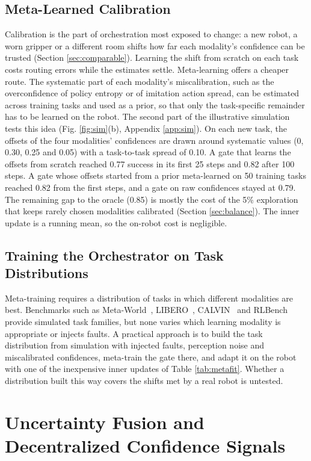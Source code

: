\documentclass[journal]{IEEEtran}
\begin{document}
\subsection{Meta-Learned Calibration}\label{sec:metacal}
Calibration is the part of orchestration most exposed to change: a new robot, a worn gripper or a different room shifts how far each modality's confidence can be trusted (Section \ref{sec:comparable}). Learning the shift from scratch on each task costs routing errors while the estimates settle. Meta-learning offers a cheaper route. The systematic part of each modality's miscalibration, such as the overconfidence of policy entropy or of imitation action spread, can be estimated across training tasks and used as a prior, so that only the task-specific remainder has to be learned on the robot. The second part of the illustrative simulation tests this idea (Fig. \ref{fig:sim}(b), Appendix \ref{app:sim}). On each new task, the offsets of the four modalities' confidences are drawn around systematic values (0, 0.30, 0.25 and 0.05) with a task-to-task spread of 0.10. A gate that learns the offsets from scratch reached 0.77 success in its first 25 steps and 0.82 after 100 steps. A gate whose offsets started from a prior meta-learned on 50 training tasks reached 0.82 from the first steps, and a gate on raw confidences stayed at 0.79. The remaining gap to the oracle (0.85) is mostly the cost of the 5\% exploration that keeps rarely chosen modalities calibrated (Section \ref{sec:balance}). The inner update is a running mean, so the on-robot cost is negligible.


\subsection{Training the Orchestrator on Task Distributions}\label{sec:taskdist}
Meta-training requires a distribution of tasks in which different modalities are best. Benchmarks such as Meta-World~\cite{Yu2019}, LIBERO~\cite{Liu2023b}, CALVIN~\cite{Mees2022} and RLBench~\cite{James2020} provide simulated task families, but none varies which learning modality is appropriate or injects faults. A practical approach is to build the task distribution from simulation with injected faults, perception noise and miscalibrated confidences, meta-train the gate there, and adapt it on the robot with one of the inexpensive inner updates of Table \ref{tab:metafit}. Whether a distribution built this way covers the shifts met by a real robot is untested.


\section{Uncertainty Fusion and Decentralized Confidence Signals}\label{sec:fusion}
\end{document}
